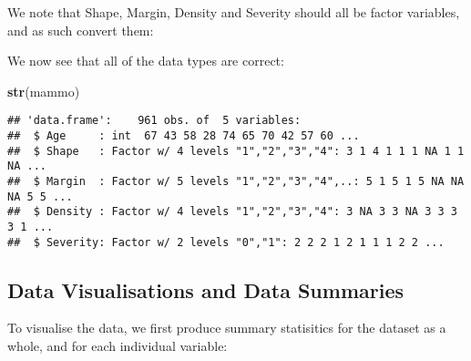 \documentclass[]{article}
\newenvironment{Shaded}{\begin{snugshade}}{\end{snugshade}}
\newcommand{\KeywordTok}[1]{\textcolor[rgb]{0.13,0.29,0.53}{\textbf{#1}}}
\newcommand{\StringTok}[1]{\textcolor[rgb]{0.31,0.60,0.02}{#1}}
\newcommand{\OperatorTok}[1]{\textcolor[rgb]{0.81,0.36,0.00}{\textbf{#1}}}
\newcommand{\NormalTok}[1]{#1}
\begin{document}
We note that Shape, Margin, Density and Severity should all be factor
variables, and as such convert them:

\begin{Shaded}
\end{Shaded}

We now see that all of the data types are correct:

\begin{Shaded}
\begin{Highlighting}[]
\KeywordTok{str}\NormalTok{(mammo)}
\end{Highlighting}
\end{Shaded}

\begin{verbatim}
## 'data.frame':    961 obs. of  5 variables:
##  $ Age     : int  67 43 58 28 74 65 70 42 57 60 ...
##  $ Shape   : Factor w/ 4 levels "1","2","3","4": 3 1 4 1 1 1 NA 1 1 NA ...
##  $ Margin  : Factor w/ 5 levels "1","2","3","4",..: 5 1 5 1 5 NA NA NA 5 5 ...
##  $ Density : Factor w/ 4 levels "1","2","3","4": 3 NA 3 3 NA 3 3 3 3 1 ...
##  $ Severity: Factor w/ 2 levels "0","1": 2 2 2 1 2 1 1 1 2 2 ...
\end{verbatim}

\subsection{Data Visualisations and Data
Summaries}\label{data-visualisations-and-data-summaries}

To visualise the data, we first produce summary statisitics for the
dataset as a whole, and for each individual variable:

\begin{Shaded}
\end{Shaded}
\end{document}
